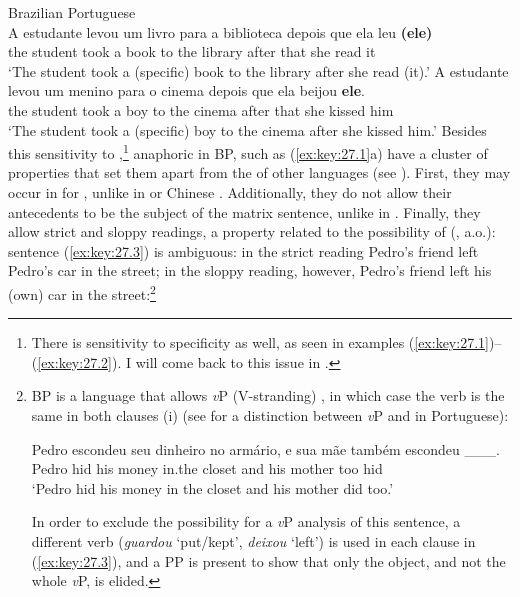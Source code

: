 \documentclass[output=paper]{langsci/langscibook}
\begin{document}
\ea\label{ex:key:27.2}Brazilian Portuguese\\
    \ea
        \gll A    estudante levou    um   livro   para  a     biblioteca depois que  ela    leu \textbf{(ele)}\\
            the   student      took     a     book   to       the   library after     that  she  read \hphantom{(}it\\
        \glt `The student took a (specific) book to the library after she read (it).'
    \ex
        \gll A  estudante  levou  um menino para  o     cinema     depois  que ela    beijou \textbf{ele}.\\
                the student     took   a     boy       to       the cinema after that   she  kissed  him\\
        \glt    `The student took a (specific) boy to the cinema after she kissed him.'
    \z
\z
Besides this sensitivity to ,\footnote{There is sensitivity to
specificity as well, as seen in examples
(\ref{ex:key:27.1})--(\ref{ex:key:27.2}). I will come back to this issue in
.} anaphoric  in BP, such as
(\ref{ex:key:27.1}a) have a cluster of properties that set them apart from the
 of other languages (see \citealt{CyrinoLopes2016}).  First,
they may occur in  for , unlike in  \citep{Raposo1986} or Chinese \citep{Huang1984}. Additionally, they
do not allow their antecedents to be the subject of the matrix sentence, unlike
in  \citep{Ohara2007}. Finally, they allow strict and sloppy
readings, a property related to the possibility of 
(\citealt{FiengoMay1984}, a.o.): sentence (\ref{ex:key:27.3}) is ambiguous: in
the strict reading Pedro's friend left Pedro's car in the street; in the sloppy
reading, however, Pedro's friend left his (own) car in the street:\footnote{BP
    is a language that allows \emph{v}P (V-stranding) , in which
    case the verb is the same in both clauses (i) (see
    \citealt{CyrinoMatos2005} for a distinction between \emph{v}P
     and  in Portuguese):

\begin{exe}
    \gll Pedro escondeu seu dinheiro no armário, e    sua mãe   também escondeu \_\_\_.\\
        Pedro hid his money  in.the  closet    and  his  mother too  hid\\
    \glt \enquote*{Pedro hid his money in the closet and his mother did too.}
\end{exe}

In order to exclude the possibility for a \emph{v}P  analysis of this
sentence, a different verb (\emph{guardou} `put/kept', \emph{deixou} `left') is
used in each clause in (\ref{ex:key:27.3}), and a PP is present to show that
only the object, and not the whole \emph{v}P, is elided.}
\end{document}
